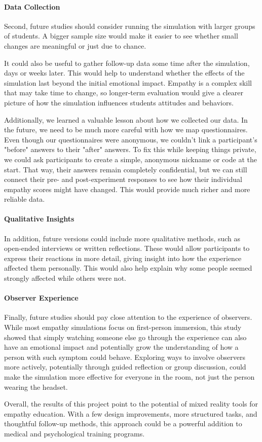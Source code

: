 \vspace{1em}

\paragraph{Data Collection} Second, future studies should consider running the simulation with larger groups of students. A bigger sample size would make it easier to see whether small changes are meaningful or just due to chance. 

It could also be useful to gather follow-up data some time after the simulation, days or weeks later. This would help to understand whether the effects of the simulation last beyond the initial emotional impact. Empathy is a complex skill that may take time to change, so longer-term evaluation would give a clearer picture of how the simulation influences students attitudes and behaviors.

Additionally, we learned a valuable lesson about how we collected our data. In the future, we need to be much more careful with how we map questionnaires. Even though our questionnaires were anonymous, we couldn't link a participant's "before" answers to their "after" answers. To fix this while keeping things private, we could ask participants to create a simple, anonymous nickname or code at the start. That way, their answers remain completely confidential, but we can still connect their pre- and post-experiment responses to see how their individual empathy scores might have changed. This would provide much richer and more reliable data.

\vspace{1em}

\paragraph{Qualitative Insights} In addition, future versions could include more qualitative methods, such as open-ended interviews or written reflections. These would allow participants to express their reactions in more detail, giving insight into how the experience affected them personally. This would also help explain why some people seemed strongly affected while others were not.

\paragraph{Observer Experience} Finally, future studies should pay close attention to the experience of observers. While most empathy simulations focus on first-person immersion, this study showed that simply watching someone else go through the experience can also have an emotional impact and potentially grow the understanding of how a person with such symptom could behave. Exploring ways to involve observers more actively, potentially through guided reflection or group discussion, could make the simulation more effective for everyone in the room, not just the person wearing the headset.

\vspace{1em}

Overall, the results of this project point to the potential of mixed reality tools for empathy education. With a few design improvements, more structured tasks, and thoughtful follow-up methods, this approach could be a powerful addition to medical and psychological training programs.